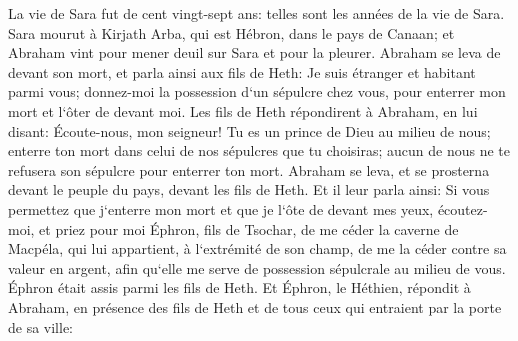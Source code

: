 \verse La vie de Sara fut de cent vingt-sept ans: telles sont les années de la vie de Sara. 
\verse Sara mourut à Kirjath Arba, qui est Hébron, dans le pays de Canaan; et Abraham vint pour mener deuil sur Sara et pour la pleurer. 
\verse Abraham se leva de devant son mort, et parla ainsi aux fils de Heth: 
\verse Je suis étranger et habitant parmi vous; donnez-moi la possession d`un sépulcre chez vous, pour enterrer mon mort et l`ôter de devant moi. 
\verse Les fils de Heth répondirent à Abraham, en lui disant: 
\verse Écoute-nous, mon seigneur! Tu es un prince de Dieu au milieu de nous; enterre ton mort dans celui de nos sépulcres que tu choisiras; aucun de nous ne te refusera son sépulcre pour enterrer ton mort. 
\verse Abraham se leva, et se prosterna devant le peuple du pays, devant les fils de Heth. 
\verse Et il leur parla ainsi: Si vous permettez que j`enterre mon mort et que je l`ôte de devant mes yeux, écoutez-moi, et priez pour moi Éphron, fils de Tsochar, 
\verse de me céder la caverne de Macpéla, qui lui appartient, à l`extrémité de son champ, de me la céder contre sa valeur en argent, afin qu`elle me serve de possession sépulcrale au milieu de vous. 
\verse Éphron était assis parmi les fils de Heth. Et Éphron, le Héthien, répondit à Abraham, en présence des fils de Heth et de tous ceux qui entraient par la porte de sa ville: 
